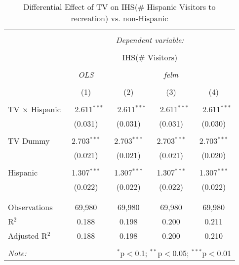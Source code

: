 
\begin{table}[!htbp] \centering 
  \caption{Differential Effect of TV on IHS(\# Hispanic Visitors to recreation) vs. non-Hispanic} 
  \label{} 
\begin{tabular}{@{\extracolsep{-2pt}}lcccc} 
\\[-1.8ex]\hline 
\hline \\[-1.8ex] 
 & \multicolumn{4}{c}{\textit{Dependent variable:}} \\ 
\cline{2-5} 
\\[-1.8ex] & \multicolumn{4}{c}{IHS(\# Visitors)} \\ 
\\[-1.8ex] & \textit{OLS} & \multicolumn{3}{c}{\textit{felm}} \\ 
\\[-1.8ex] & (1) & (2) & (3) & (4)\\ 
\hline \\[-1.8ex] 
 TV $\times$ Hispanic & $-$2.611$^{***}$ & $-$2.611$^{***}$ & $-$2.611$^{***}$ & $-$2.611$^{***}$ \\ 
  & (0.031) & (0.031) & (0.031) & (0.030) \\ 
  & & & & \\ 
 TV Dummy & 2.703$^{***}$ & 2.703$^{***}$ & 2.703$^{***}$ & 2.703$^{***}$ \\ 
  & (0.021) & (0.021) & (0.021) & (0.020) \\ 
  & & & & \\ 
 Hispanic & 1.307$^{***}$ & 1.307$^{***}$ & 1.307$^{***}$ & 1.307$^{***}$ \\ 
  & (0.022) & (0.022) & (0.022) & (0.022) \\ 
  & & & & \\ 
\hline \\[-1.8ex] 
Observations & 69,980 & 69,980 & 69,980 & 69,980 \\ 
R$^{2}$ & 0.188 & 0.198 & 0.200 & 0.211 \\ 
Adjusted R$^{2}$ & 0.188 & 0.198 & 0.200 & 0.210 \\ 
\hline 
\hline \\[-1.8ex] 
\textit{Note:}  & \multicolumn{4}{r}{$^{*}$p$<$0.1; $^{**}$p$<$0.05; $^{***}$p$<$0.01} \\ 
\end{tabular} 
\end{table} 
